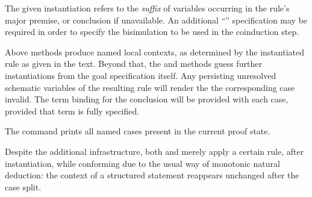 \begin{isabellebody}
\begin{isamarkuptext}
\begin{description}
  The given instantiation refers to the \emph{suffix} of variables
  occurring in the rule's major premise, or conclusion if unavailable.
  An additional ``''
  specification may be required in order to specify the bisimulation
  to be used in the coinduction step.

  \end{description}

  Above methods produce named local contexts, as determined by the
  instantiated rule as given in the text.  Beyond that, the \hyperlink{method.induct}{\mbox{}} and \hyperlink{method.coinduct}{\mbox{}} methods guess further instantiations
  from the goal specification itself.  Any persisting unresolved
  schematic variables of the resulting rule will render the the
  corresponding case invalid.  The term binding \hyperlink{variable.?case}{\mbox{}} for
  the conclusion will be provided with each case, provided that term
  is fully specified.

  The \hyperlink{command.print-cases}{\mbox{}} command prints all named cases present
  in the current proof state.

  \medskip Despite the additional infrastructure, both \hyperlink{method.cases}{\mbox{}}
  and \hyperlink{method.coinduct}{\mbox{}} merely apply a certain rule, after
  instantiation, while conforming due to the usual way of monotonic
  natural deduction: the context of a structured statement 
  reappears unchanged after the case split.


\end{isamarkuptext}
\end{isabellebody}
